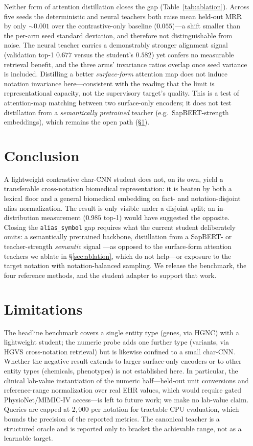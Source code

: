 \documentclass[11pt]{article}
\begin{document}
Neither form of attention distillation closes the gap (Table~\ref{tab:ablation}).
Across five seeds the deterministic and neural teachers both raise mean held-out
MRR by only $\sim\!0.001$ over the contrastive-only baseline ($0.055$)---a shift
smaller than the per-arm seed standard deviation, and therefore not distinguishable
from noise. The neural teacher carries a demonstrably stronger alignment signal
(validation top-1 $0.677$ versus the student's $0.582$) yet confers no measurable
retrieval benefit, and the three arms' invariance ratios overlap once seed variance
is included. Distilling a better \emph{surface-form} attention map does not induce
notation invariance here---consistent with the reading that the limit is
representational capacity, not the supervisory target's quality. This is a
test of attention-map matching between two surface-only encoders; it does not test
distillation from a \emph{semantically pretrained} teacher (e.g.\ SapBERT-strength
embeddings), which remains the open path (\S\ref{sec:conclusion}).

\section{Conclusion}
\label{sec:conclusion}
A lightweight contrastive char-CNN student does not, on its own, yield a
transferable cross-notation biomedical representation: it is beaten by both a
lexical floor and a general biomedical embedding on fact- and notation-disjoint
alias normalization. The result is only visible under a disjoint split; an
in-distribution measurement ($0.985$ top-1) would have suggested the opposite.
Closing the \texttt{alias\_symbol} gap requires what the current student
deliberately omits: a semantically pretrained backbone, distillation from a
SapBERT- or teacher-strength \emph{semantic} signal \citep{hinton2015distilling,
tian2020crd, hofstatter2020improving}---as opposed to the surface-form attention
teachers we ablate in \S\ref{sec:ablation}, which do not help---or exposure to the
target notation with notation-balanced sampling. We release the benchmark, the four reference methods,
and the student adapter to support that work.

\section*{Limitations}
The headline benchmark covers a single entity type (genes, via HGNC) with a
lightweight student; the numeric probe adds one further type (variants, via HGVS
cross-notation retrieval) but is likewise confined to a small char-CNN. Whether the
negative result extends to larger surface-only encoders or to other entity types
(chemicals, phenotypes) is not established here. In particular, the clinical
lab-value instantiation of the numeric half---held-out unit conversions and
reference-range normalization over real EHR values, which would require gated
PhysioNet/MIMIC-IV access---is left to future work; we make no lab-value claim.
Queries are capped at $2{,}000$ per notation for tractable CPU
evaluation, which bounds the precision of the reported metrics. The canonical
teacher is a structured oracle and is reported only to bracket the achievable
range, not as a learnable target.
\end{document}
